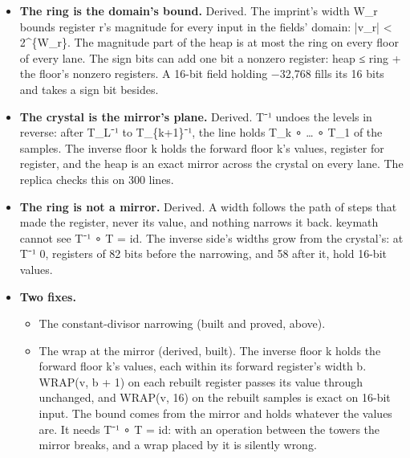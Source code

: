 \begin{itemize}
\begin{itemize}
\item The heap pinches at the crystal by 12× for the ramp, 3.2× at ±8 and 1.3× at ±1,024, and not at all for noise.
\item The live bits peak at the last cut (5,079), not at the crystal (1,656).
\item 128 samples at 7 levels are refused: 93-bit registers overflow the 256-limb file.
\end{itemize}
\item \textbf{The ring is the domain's bound.} Derived. The imprint's width W\_\allowbreak{}r bounds register r's magnitude for every input in the fields' domain: |v\_\allowbreak{}r| < 2\textasciicircum{}\{W\_\allowbreak{}r\}. The magnitude part of the heap is at most the ring on every floor of every lane. The sign bits can add one bit a nonzero register: heap ≤ ring + the floor's nonzero registers. A 16-bit field holding −32,768 fills its 16 bits and takes a sign bit besides.
\item \textbf{The crystal is the mirror's plane.} Derived. T⁻¹ undoes the levels in reverse: after T\_\allowbreak{}L⁻¹ to T\_\allowbreak{}\{k+1\}⁻¹, the line holds T\_\allowbreak{}k ∘ … ∘ T\_\allowbreak{}1 of the samples. The inverse floor k holds the forward floor k's values, register for register, and the heap is an exact mirror across the crystal on every lane. The replica checks this on 300 lines.
\item \textbf{The ring is not a mirror.} Derived. A width follows the path of steps that made the register, never its value, and nothing narrows it back. keymath cannot see T⁻¹ ∘ T = id. The inverse side's widths grow from the crystal's: at T⁻¹ 0, registers of 82 bits before the narrowing, and 58 after it, hold 16-bit values.
\item \textbf{Two fixes.}

\begin{itemize}
\item The constant-divisor narrowing (built and proved, above).
\item The wrap at the mirror (derived, built). The inverse floor k holds the forward floor k's values, each within its forward register's width b. WRAP(v, b + 1) on each rebuilt register passes its value through unchanged, and WRAP(v, 16) on the rebuilt samples is exact on 16-bit input. The bound comes from the mirror and holds whatever the values are. It needs T⁻¹ ∘ T = id: with an operation between the towers the mirror breaks, and a wrap placed by it is silently wrong.


\end{itemize}
\end{itemize}
